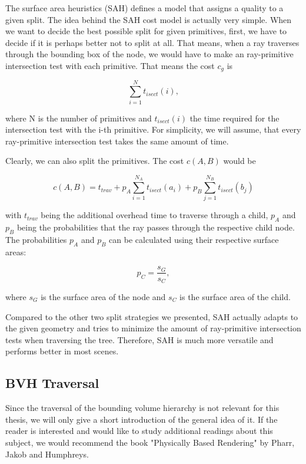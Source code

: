 The surface area heuristics (SAH) defines a model that assigns a quality to a given split. The idea behind the SAH cost model is actually very simple. When we want to decide the best possible split for given primitives, first, we have to decide if it is perhaps better not to split at all. That means, when a ray traverses through the bounding box of the node, we would have to make an ray-primitive intersection test with each primitive. That means the cost $c_g$ is 

\begin{equation}
\sum_{i = 1}^{N}t_{isect}(i),
\end{equation}

where N is the number of primitives and $t_{isect}(i)$ the time required for the intersection test with the i-th primitive. For simplicity, we will assume, that every ray-primitive intersection test takes the same amount of time.

Clearly, we can also split the primitives. The cost $c(A,B)$ would be

\begin{equation}
c(A,B) = t_{trav} + p_A\sum_{i=1}^{N_A}t_{isect}(a_i) + p_B\sum_{j=1}^{N_B}t_{isect}(b_j)
\end{equation}

with $t_{trav}$ being the additional overhead time to traverse through a child, $p_A$ and $p_B$ being the probabilities that the ray passes through the respective child node. The probabilities $p_A$ and $p_B$ can be calculated using their respective surface areas:

\begin{equation}
p_C = \frac{s_G}{s_C},
\end{equation}

where $s_G$ is the surface area of the node and $s_C$ is the surface area of the child.

Compared to the other two split strategies we presented, SAH actually adapts to the given geometry and tries to minimize the amount of ray-primitive intersection tests when traversing the tree. Therefore, SAH is much more versatile and performs better in most scenes.

\subsection{BVH Traversal}

Since the traversal of the bounding volume hierarchy is not relevant for this thesis, we will only give a short introduction of the general idea of it. If the reader is interested and would like to study additional readings about this subject, we would recommend the book "Physically Based Rendering" by Pharr, Jakob and Humphreys. \Cite{PBR}

